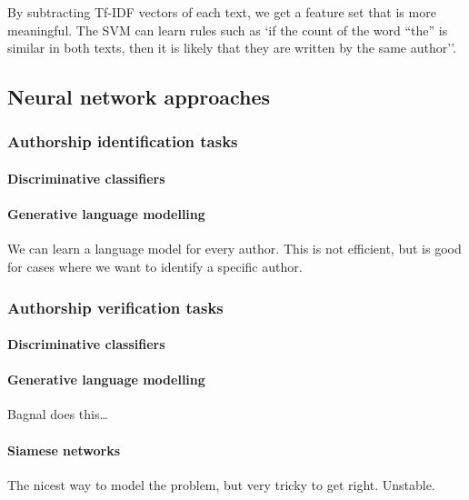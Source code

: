 By subtracting Tf-IDF vectors of each text, we get a feature set that is
more meaningful. The SVM can learn rules such as `if the count of the
word ``the'' is similar in both texts, then it is likely that they are
written by the same author''.

\subsection{Neural network approaches}\label{neural-network-approaches}

\subsubsection{Authorship identification
tasks}\label{authorship-identification-tasks-2}

\paragraph{Discriminative classifiers}\label{discriminative-classifiers}

\paragraph{Generative language
modelling}\label{generative-language-modelling}

We can learn a language model for every author. This is not efficient,
but is good for cases where we want to identify a specific author.

\subsubsection{Authorship verification
tasks}\label{authorship-verification-tasks-2}

\paragraph{Discriminative
classifiers}\label{discriminative-classifiers-1}

\paragraph{Generative language
modelling}\label{generative-language-modelling-1}

Bagnal does this\ldots{}

\paragraph{Siamese networks}\label{siamese-networks}

The nicest way to model the problem, but very tricky to get right.
Unstable.
